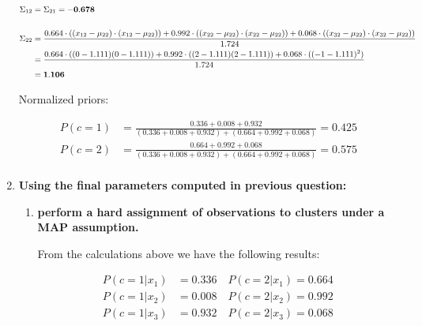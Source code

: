 \documentclass[12pt]{article}
\begin{document}
\begin{enumerate}
    \begin{equation*}
        \fontsize{9pt}{10pt}\selectfont
        \begin{aligned}
            \Sigma_{12} &= \Sigma_{21} = \mathbf{-0.678}\\
            \\
            \Sigma_{22} &= \frac{0.664 \cdot ((x_{12}-\mu_{22}) \cdot (x_{12} - \mu_{22}))+ 0.992 \cdot ((x_{22}-\mu_{22}) \cdot (x_{22} - \mu_{22}))+ 0.068 \cdot ((x_{32}-\mu_{22}) \cdot (x_{32} - \mu_{22}))}{1.724}\\
            &=\frac{0.664 \cdot ((0-1.111)(0-1.111)) + 0.992 \cdot ((2-1.111)(2-1.111)) + 0.068 \cdot ((-1-1.111)^2)}{1.724}\\
            &= \mathbf{1.106}\\
        \end{aligned}
    \end{equation*}

    \newpage
    Normalized priors:

    \begin{equation*}
        \begin{aligned}
            P(c=1) &= \frac{0.336+0.008+0.932}{(0.336+0.008+0.932) + (0.664+0.992+0.068)} = 0.425\\
            P(c=2) &= \frac{0.664+0.992+0.068}{(0.336+0.008+0.932) + (0.664+0.992+0.068)} = 0.575\\
        \end{aligned}
    \end{equation*}

    \vspace{10pt}
    \item \textbf{Using the ﬁnal parameters computed in previous question:}
    \begin{enumerate}[label=\alph*)]
        \item \textbf{perform a hard assignment of observations to clusters under a MAP assumption.}
        
        \vspace{10pt}
        From the calculations above we have the following results:

        \begin{equation*}
            \begin{aligned}
                P(c=1|x_1) &= 0.336 \quad P(c=2|x_1) = 0.664\\
                P(c=1|x_2) &= 0.008 \quad P(c=2|x_2) = 0.992\\
                P(c=1|x_3) &= 0.932 \quad P(c=2|x_3) = 0.068\\
            \end{aligned}
        \end{equation*}


\end{enumerate}
\end{enumerate}
\end{document}
